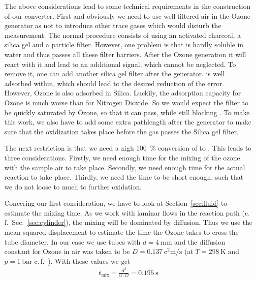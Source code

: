 The above considerations lead to some technical requirements in the
construction of our converter. First and obviously we need to use well
filtered air in the Ozone generator as not to introduce other trace
gases which would disturb the measurement. The normal procedure
consists of using an activated charcoal, a silica gel and a particle
filter. However, one problem is that  is hardly soluble in
water and thus passes all these filter barriers. After the Ozone
generation it will react with it and lead to an additional 
signal, which cannot be neglected. To remove it, one can add
another silica gel filter after the generator.  is well
adsorbed within, which should lead to the desired reduction of the
error. However, Ozone is also adsorbed in Silica. Luckily, the
adsorption capacity for Ozone is much worse than for Nitrogen
Dioxide. So we would expect the filter to be quickly saturated by
Ozone, so that it can pass, while still blocking . To make
this work, we also have to add some extra pathlength after the
generator to make sure that the oxidization takes place before the gas
passes the Silica gel filter.

The next restriction is that we need a nigh \SI{100}{\%} conversion of
 to . This leads to three considerations. Firstly, we
need enough time for the mixing of the ozone with the sample air to
take place. Secondly, we need enough time for the actual reaction to
take place. Thirdly, we need the time to be short enough, such that we
do not loose to much  to further oxidation.

Concering our first consideration, we have to look at
Section~\ref{sec:fluid} to estimate the mixing time. As we work with
laminar flows in the reaction path (c.\,f.\ Sec.~\ref{sec:cylinder}),
the mixing will be dominated by diffusion. Thus we use the mean
squared displacement to estimate the time the Ozone takes to cross the
tube diameter. In our case we use tubes with $d =
\SI{4}{\milli\meter}$ and the diffusion constant for Ozone in air was
taken to be $D = \SI{0.137}{\square\centi\meter\per\second}$ (at $T =
\SI{298}{\kelvin}$ and $p = \SI{1}{\text{bar}}$
c.\,f.~\cite{diff-ozone}). With these values we get
\begin{align*}
  t_{\text{mix}} = \frac{d^2}{6\cdot D} = \SI{0.195}{\second}
\end{align*}

